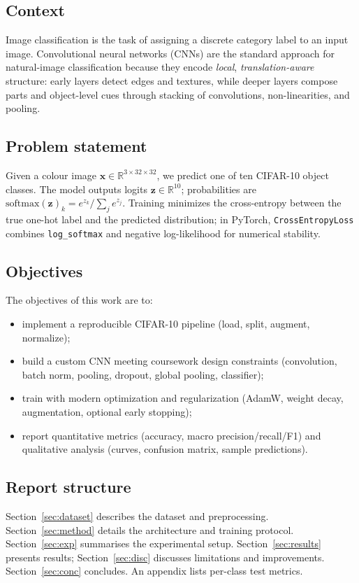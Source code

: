 \documentclass[11pt,a4paper]{article}
\begin{document}
\subsection{Context}
Image classification is the task of assigning a discrete category label to an input image. Convolutional neural networks (CNNs) are the standard approach for natural-image classification because they encode \emph{local}, \emph{translation-aware} structure: early layers detect edges and textures, while deeper layers compose parts and object-level cues through stacking of convolutions, non-linearities, and pooling.

\subsection{Problem statement}
Given a colour image $\mathbf{x} \in \mathbb{R}^{3\times 32\times 32}$, we predict one of ten CIFAR-10 object classes. The model outputs logits $\mathbf{z}\in\mathbb{R}^{10}$; probabilities are $\mathrm{softmax}(\mathbf{z})_k = e^{z_k}/\sum_j e^{z_j}$. Training minimizes the cross-entropy between the true one-hot label and the predicted distribution; in PyTorch, \texttt{CrossEntropyLoss} combines \texttt{log\_softmax} and negative log-likelihood for numerical stability.

\subsection{Objectives}
The objectives of this work are to:
\begin{itemize}[noitemsep]
  \item implement a reproducible CIFAR-10 pipeline (load, split, augment, normalize);
  \item build a custom CNN meeting coursework design constraints (convolution, batch norm, pooling, dropout, global pooling, classifier);
  \item train with modern optimization and regularization (AdamW, weight decay, augmentation, optional early stopping);
  \item report quantitative metrics (accuracy, macro precision/recall/F1) and qualitative analysis (curves, confusion matrix, sample predictions).
\end{itemize}

\subsection{Report structure}
Section~\ref{sec:dataset} describes the dataset and preprocessing. Section~\ref{sec:method} details the architecture and training protocol. Section~\ref{sec:exp} summarises the experimental setup. Section~\ref{sec:results} presents results; Section~\ref{sec:disc} discusses limitations and improvements. Section~\ref{sec:conc} concludes. An appendix lists per-class test metrics.
\end{document}
